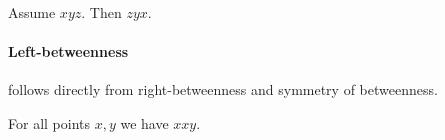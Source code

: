 \documentclass[10pt,a4paper,parskip=half,numbers=endperiod,headings=standardclasses,parskip]{scrbook}
\newcommand{\Betw}[3]{#1 #2 #3}
\begin{document}
  \begin{forthel}
    \begin{lemma} %
      Assume $\Betw{x}{y}{z}$. Then $\Betw{z}{y}{x}$.
    \end{lemma}
  \end{forthel}

  \paragraph{Left-betweenness} follows directly
  from right-betweenness and symmetry of betweenness.
  \begin{forthel}
    \begin{lemma} %
      For all points $x, y$ we have  $\Betw{x}{x}{y}$.
    \end{lemma}
  \end{forthel}
\end{document}
